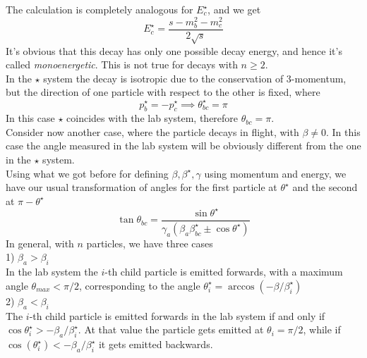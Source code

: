 \documentclass[../admech.tex]{subfiles}
\begin{document}
The calculation is completely analogous for $E_c^\star$, and we get
\begin{equation}
	E_c^\star=\frac{s-m_b^2-m_c^2}{2\sqrt{s}}
	\label{eq:disrel2decrootscpart}
\end{equation}
It's obvious that this decay has only one possible decay energy, and hence it's called \emph{monoenergetic}. This is not true for decays with $n\ge2$.\\
In the $\star$ system the decay is isotropic due to the conservation of 3-momentum, but the direction of one particle with respect to the other is fixed, where
\begin{equation*}
	p^\star_b=-p^\star_c\implies\theta_{bc}^\star=\pi
\end{equation*}
In this case $\star$ coincides with the lab system, therefore $\theta_{bc}=\pi$.\\
Consider now another case, where the particle decays in flight, with $\beta\ne0$. In this case the angle measured in the lab system will be obviously different from the one in the $\star$ system.\\
Using what we got before for defining $\beta,\beta^\star,\gamma$ using momentum and energy, we have our usual transformation of angles for the first particle at $\theta^\star$ and the second at $\pi-\theta^\star$
\begin{equation}
	\tan\theta_{bc}=\frac{\sin\theta^\star}{\gamma_a\left( \beta_a\beta^\star_{bc}\pm\cos\theta^\star \right)}
	\label{eq:angletrflightdecay}
\end{equation}
In general, with $n$ particles, we have three cases\\
1) $\beta_a>\beta_{i}$\\
In the lab system the $i$-th child particle is emitted forwards, with a maximum angle $\theta_{max}<\pi/2$, corresponding to the angle $\theta^\star_i=\arccos\left( -\beta/\beta_i^\star \right)$\\
2) $\beta_a<\beta_i$\\
The $i$-th child particle is emitted forwards in the lab system if and only if $\cos\theta^\star_i>-\beta_a/\beta^\star_i$. At that value the particle gets emitted at $\theta_i=\pi/2$, while if $\cos(\theta_i^\star)<-\beta_a/\beta_i^\star$ it gets emitted backwards.
\end{document}
